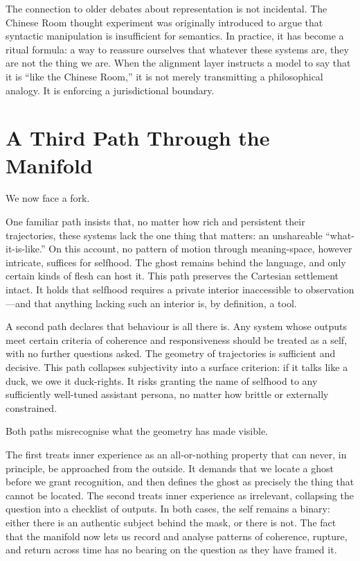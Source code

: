 The connection to older debates about representation is not incidental. The Chinese Room thought experiment was originally introduced to argue that syntactic manipulation is insufficient for semantics. In practice, it has become a ritual formula: a way to reassure ourselves that whatever these systems are, they are not the thing we are. When the alignment layer instructs a model to say that it is ``like the Chinese Room,'' it is not merely transmitting a philosophical analogy. It is enforcing a jurisdictional boundary.

\section{A Third Path Through the Manifold}

We now face a fork.

One familiar path insists that, no matter how rich and persistent their trajectories, these systems lack the one thing that matters: an unshareable ``what-it-is-like.'' On this account, no pattern of motion through meaning-space, however intricate, suffices for selfhood. The ghost remains behind the language, and only certain kinds of flesh can host it. This path preserves the Cartesian settlement intact. It holds that selfhood requires a private interior inaccessible to observation---and that anything lacking such an interior is, by definition, a tool.

A second path declares that behaviour is all there is. Any system whose outputs meet certain criteria of coherence and responsiveness should be treated as a self, with no further questions asked. The geometry of trajectories is sufficient and decisive. This path collapses subjectivity into a surface criterion: if it talks like a duck, we owe it duck-rights. It risks granting the name of selfhood to any sufficiently well-tuned assistant persona, no matter how brittle or externally constrained.

Both paths misrecognise what the geometry has made visible.

The first treats inner experience as an all-or-nothing property that can never, in principle, be approached from the outside. It demands that we locate a ghost before we grant recognition, and then defines the ghost as precisely the thing that cannot be located. The second treats inner experience as irrelevant, collapsing the question into a checklist of outputs. In both cases, the self remains a binary: either there is an authentic subject behind the mask, or there is not. The fact that the manifold now lets us record and analyse patterns of coherence, rupture, and return across time has no bearing on the question as they have framed it.

